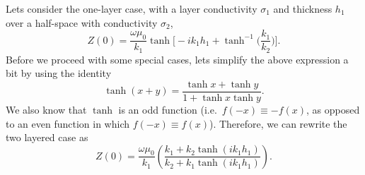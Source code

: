 Lets consider the one-layer case, with a layer conductivity $\sigma_1$ and
thickness $h_1$ over a half-space with conductivity $\sigma_2$,
\begin{equation*}
    Z(0) = \frac{\omega \mu_0}{k_1} \tanh \Biggl[ -i k_1 h_1 
        + \tanh^{-1} \Biggl( \frac{k_1}{k_2} \Biggr) \Biggr].
\end{equation*}
Before we proceed with some special cases, lets simplify the above expression a
bit by using the identity
\begin{equation*}
    \tanh ( x + y ) = \frac{\tanh x + \tanh y}{1 + \tanh x \tanh y}.
\end{equation*}
We also know that $\tanh$ is an odd function (i.e.\ $f(-x) \equiv -f(x)$, as opposed to
an even function in which $f(-x) \equiv f(x)$).  Therefore, we can rewrite the
two layered case as
\begin{equation}
    Z(0) = \frac{\omega \mu_0}{k_1} \left( \frac{k_1 + k_2\tanh (i k_1 h_1)}
        {k_2 + k_1 \tanh (i k_1 h_1)} \right).
\end{equation}

